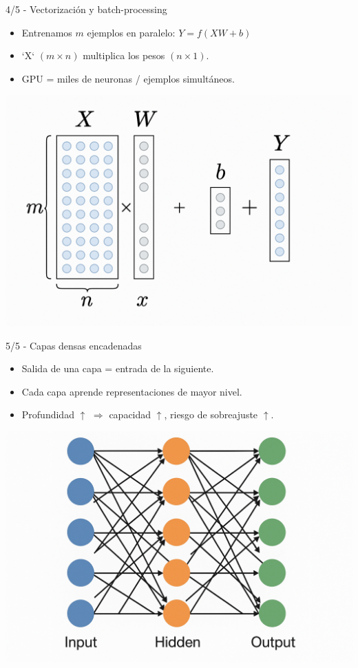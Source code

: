 \documentclass[8pt,spanish]{beamer}
\begin{document}
\begin{frame}{4/5  -  Vectorización y batch-processing}
  \begin{itemize}
    \item Entrenamos \(m\) ejemplos en paralelo:
      \(Y = f(XW + b)\)
    \item `X` \((m \times n)\) multiplica los pesos \((n \times 1)\).
    \item GPU = miles de neuronas / ejemplos simultáneos.
  \end{itemize}
  \centering
  \includegraphics[width=.6\textwidth]{vectoriz.png}
\end{frame}

\begin{frame}{5/5  -  Capas densas encadenadas}
  \begin{itemize}
    \item Salida de una capa = entrada de la siguiente.
    \item Cada capa aprende representaciones de mayor nivel.
    \item Profundidad \(\uparrow\) \(\Rightarrow\) capacidad \(\uparrow\),
          riesgo de sobreajuste \(\uparrow\).
  \end{itemize}
  \centering
  \includegraphics[width=.55\textwidth]{inp-hid-out.png}
\end{frame}
\end{document}
